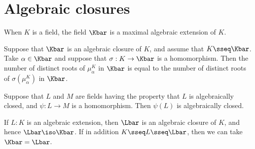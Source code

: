 \documentclass{article}
\begin{document}
\section{Algebraic closures}


\begin{tcorollary}
  When $ K $ is a field, the field $ \Kbar $ is a maximal algebraic extension of $ K $.
\end{tcorollary}


\begin{tcorollary}
  Suppose that $ \Kbar $ is an algebraic closure of $ K $, and assume that $ K\sseq \Kbar $.
  Take $ \alpha\in \Kbar $ and suppose that $ \sigma:K\to \Kbar $ is a homomorphism.
  Then the number of distinct roots of $ \mu_\alpha^K $ in $ \Kbar $ is equal to the number of distinct roots of $ \sigma(\mu_\alpha^K) $ in $ \Kbar $.
\end{tcorollary}

\begin{tproposition}
  Suppose that $L$ and $M$ are fields having the property that $L$ is algebraically closed, and $\psi : L \to M $ is a homomorphism.
  Then $\psi(L)$ is algebraically closed.
\end{tproposition}

\begin{tproposition}
  If $ L:K $ is an algebraic extension, then $ \Lbar $ is an algebraic closure of $ K $, and hence $ \Lbar\iso\Kbar $.
  If in addition $ K\sseq L\sseq \Lbar $, then we can take $ \Kbar = \Lbar $.
\end{tproposition}
\end{document}
